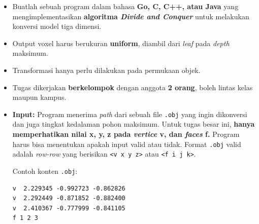 \begin{itemize}[leftmargin=*]
    \item Buatlah sebuah program dalam bahasa \textbf{Go, C, C++,
        atau Java} yang mengimplementasikan \textbf{algoritma
        \textit{Divide and Conquer}} untuk melakukan konversi model
        tiga dimensi.
    \item Output voxel harus berukuran \textbf{uniform}, diambil dari
        \textit{leaf} pada \textit{depth} maksimum.
    \item Transformasi hanya perlu dilakukan pada permukaan objek.
    \item Tugas dikerjakan \textbf{berkelompok} dengan anggota
        \textbf{2 orang}, boleh lintas kelas maupun kampus.
    \item \textbf{Input:} Program menerima \textit{path} dari sebuah
        file \texttt{.obj} yang ingin dikonversi dan juga tingkat
        kedalaman pohon maksimum. Untuk tugas besar ini,
        \textbf{hanya memperhatikan nilai x, y, z pada
        \textit{vertice} v, dan \textit{faces} f.} Program harus bisa
        menentukan apakah input valid atau tidak. Format
        \texttt{.obj} valid adalah \textit{row-row} yang berisikan
        \texttt{<v x y z>} atau \texttt{<f i j k>}.

        Contoh konten \texttt{.obj}:
        \begin{tcolorbox}[colback=white, colframe=black, sharp
            corners, boxrule=0.5pt]
\begin{verbatim}
v  2.229345 -0.992723 -0.862826
v  2.292449 -0.871852 -0.882400
v  2.410367 -0.777999 -0.841105
f 1 2 3
    \end{verbatim}
        \end{tcolorbox}


\end{itemize}
